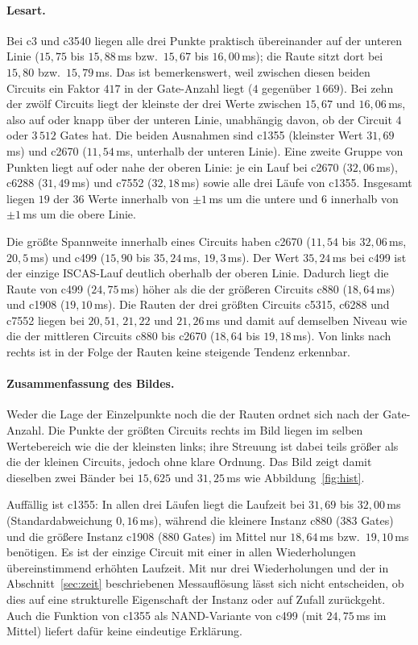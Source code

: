 \documentclass[a4paper,12pt]{article}
\theoremstyle{definition}
\begin{document}
\paragraph{Lesart.} Bei c3 und c3540 liegen alle drei Punkte praktisch übereinander auf der unteren Linie ($15{,}75$ bis $15{,}88$\,ms bzw.\ $15{,}67$ bis $16{,}00$\,ms); die Raute sitzt dort bei $15{,}80$ bzw.\ $15{,}79$\,ms. Das ist bemerkenswert, weil zwischen diesen beiden Circuits ein Faktor $417$ in der Gate-Anzahl liegt ($4$ gegenüber $1\,669$). Bei zehn der zwölf Circuits liegt der kleinste der drei Werte zwischen $15{,}67$ und $16{,}06$\,ms, also auf oder knapp über der unteren Linie, unabhängig davon, ob der Circuit $4$ oder $3\,512$ Gates hat. Die beiden Ausnahmen sind c1355 (kleinster Wert $31{,}69$\,ms) und c2670 ($11{,}54$\,ms, unterhalb der unteren Linie). Eine zweite Gruppe von Punkten liegt auf oder nahe der oberen Linie: je ein Lauf bei c2670 ($32{,}06$\,ms), c6288 ($31{,}49$\,ms) und c7552 ($32{,}18$\,ms) sowie alle drei Läufe von c1355. Insgesamt liegen $19$ der $36$ Werte innerhalb von $\pm 1$\,ms um die untere und $6$ innerhalb von $\pm 1$\,ms um die obere Linie.

Die größte Spannweite innerhalb eines Circuits haben c2670 ($11{,}54$ bis $32{,}06$\,ms, $20{,}5$\,ms) und c499 ($15{,}90$ bis $35{,}24$\,ms, $19{,}3$\,ms). Der Wert $35{,}24$\,ms bei c499 ist der einzige ISCAS-Lauf deutlich oberhalb der oberen Linie. Dadurch liegt die Raute von c499 ($24{,}75$\,ms) höher als die der größeren Circuits c880 ($18{,}64$\,ms) und c1908 ($19{,}10$\,ms). Die Rauten der drei größten Circuits c5315, c6288 und c7552 liegen bei $20{,}51$, $21{,}22$ und $21{,}26$\,ms und damit auf demselben Niveau wie die der mittleren Circuits c880 bis c2670 ($18{,}64$ bis $19{,}18$\,ms). Von links nach rechts ist in der Folge der Rauten keine steigende Tendenz erkennbar.

\paragraph{Zusammenfassung des Bildes.} Weder die Lage der Einzelpunkte noch die der Rauten ordnet sich nach der Gate-Anzahl. Die Punkte der größten Circuits rechts im Bild liegen im selben Wertebereich wie die der kleinsten links; ihre Streuung ist dabei teils größer als die der kleinen Circuits, jedoch ohne klare Ordnung. Das Bild zeigt damit dieselben zwei Bänder bei $15{,}625$ und $31{,}25$\,ms wie Abbildung~\ref{fig:hist}.

Auffällig ist c1355: In allen drei Läufen liegt die Laufzeit bei $31{,}69$ bis $32{,}00$\,ms (Standardabweichung $0{,}16$\,ms), während die kleinere Instanz c880 (383 Gates) und die größere Instanz c1908 (880 Gates) im Mittel nur $18{,}64$\,ms bzw.\ $19{,}10$\,ms benötigen. Es ist der einzige Circuit mit einer in allen Wiederholungen übereinstimmend erhöhten Laufzeit. Mit nur drei Wiederholungen und der in Abschnitt~\ref{sec:zeit} beschriebenen Messauflösung lässt sich nicht entscheiden, ob dies auf eine strukturelle Eigenschaft der Instanz oder auf Zufall zurückgeht. Auch die Funktion von c1355 als NAND-Variante von c499 (mit $24{,}75$\,ms im Mittel) liefert dafür keine eindeutige Erklärung.
\end{document}
